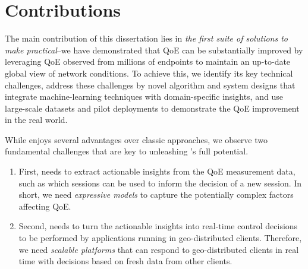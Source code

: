 \section{Contributions}

The main contribution of this dissertation lies in {\em the first suite of solutions to make \ddn 
practical}--we have demonstrated that QoE can be substantially improved by
leveraging QoE observed from millions of endpoints to maintain an up-to-date
global view of network conditions.
To achieve this, we identify its key technical challenges, address these 
challenges by novel algorithm and system designs that 
integrate machine-learning techniques with domain-specific  insights,
and use large-scale datasets and pilot 
deployments to demonstrate
the QoE improvement in the real world.

While \ddn enjoys several advantages over 
classic approaches, we observe two fundamental challenges 
that are key to unleashing \ddn's full potential.

\begin{enumerate}

\item 
First, \ddn needs to extract actionable insights from the QoE measurement data, 
such as which sessions can be used to inform the decision of a new session.
In short, we need {\em expressive models} to capture the potentially complex 
factors affecting QoE. 

\item 
Second, \ddn needs to turn the actionable insights into 
real-time control decisions to be performed by applications running in
geo-distributed clients. 
Therefore, we need {\em scalable platforms} that can respond to geo-distributed 
clients in real time with decisions based on fresh data from other clients.

\end{enumerate}

